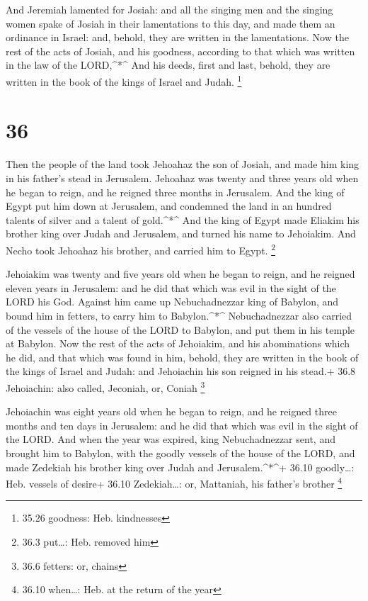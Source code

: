  And Jeremiah lamented for Josiah: and all the singing men
and the singing women spake of Josiah in their lamentations to this day,
and made them an ordinance in Israel: and, behold, they are written in
the lamentations.  Now the rest of the acts of Josiah, and
his goodness, according to that which was written in the law of the
LORD,\^{}*\^{}  And his deeds, first and last, behold, they
are written in the book of the kings of Israel and Judah. \footnote{35.26
  goodness: Heb. kindnesses}

\hypertarget{section-35}{%
\section{36}\label{section-35}}

 Then the people of the land took Jehoahaz the son of
Josiah, and made him king in his father's stead in Jerusalem.
 Jehoahaz was twenty and three years old when he began to
reign, and he reigned three months in Jerusalem.  And the
king of Egypt put him down at Jerusalem, and condemned the land in an
hundred talents of silver and a talent of gold.\^{}*\^{} 
And the king of Egypt made Eliakim his brother king over Judah and
Jerusalem, and turned his name to Jehoiakim. And Necho took Jehoahaz his
brother, and carried him to Egypt. \footnote{36.3 put\ldots: Heb.
  removed him}

 Jehoiakim was twenty and five years old when he began to
reign, and he reigned eleven years in Jerusalem: and he did that which
was evil in the sight of the LORD his God.  Against him came
up Nebuchadnezzar king of Babylon, and bound him in fetters, to carry
him to Babylon.\^{}*\^{}  Nebuchadnezzar also carried of the
vessels of the house of the LORD to Babylon, and put them in his temple
at Babylon.  Now the rest of the acts of Jehoiakim, and his
abominations which he did, and that which was found in him, behold, they
are written in the book of the kings of Israel and Judah: and Jehoiachin
his son reigned in his stead.+ 36.8 Jehoiachin: also called, Jeconiah,
or, Coniah \footnote{36.6 fetters: or, chains}

 Jehoiachin was eight years old when he began to reign, and
he reigned three months and ten days in Jerusalem: and he did that which
was evil in the sight of the LORD.  And when the year was
expired, king Nebuchadnezzar sent, and brought him to Babylon, with the
goodly vessels of the house of the LORD, and made Zedekiah his brother
king over Judah and Jerusalem.\^{}*\^{}+ 36.10 goodly\ldots: Heb.
vessels of desire+ 36.10 Zedekiah\ldots: or, Mattaniah, his father's
brother \footnote{36.10 when\ldots: Heb. at the return of the year}

